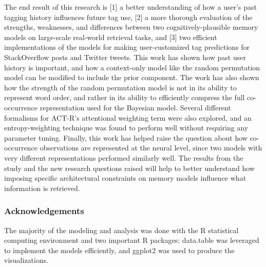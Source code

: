 \documentclass[man,floatsintext,donotrepeattitle]{apa6}
\begin{document}
The end result of this research is [1] a better understanding of how a user's past tagging history influences future tag use,
[2] a more thorough evaluation of the strengths, weaknesses, and differences between two cognitively-plausible memory models on large-scale real-world retrieval tasks,
and [3] two efficient implementations of the models for making user-customized tag predictions for StackOverflow posts and Twitter tweets. 
This work has shown how past user history is important, and how a context-only model like the random permutation model can be modified to include the prior component.
The work has also shown how the strength of the random permutation model is not in its ability to represent word order,
and rather in its ability to efficiently compress the full co-occurrence representation used for the Bayesian model.
Several different formalisms for ACT-R's attentional weighting term were also explored, and an entropy-weighting technique was found to perform well without requiring any parameter tuning.
Finally, this work has helped raise the question about how co-occurrence observations are represented at the neural level, since two models with very different representations performed similarly well.
The results from the study and the new research questions raised will help to better understand how imposing specific architectural constraints on memory models influence what information is retrieved.

\subsubsection{Acknowledgements}

The majority of the modeling and analysis was done with the R statistical computing environment \parencite{RCoreTeam2014} and two important R packages:
data.table \parencite{Dowle2014} was leveraged to implement the models efficiently, and ggplot2 \parencite{Wickham2009} was used to produce the visualizations.

\begingroup
{}
\setlength\bibitemsep{12pt}
\clearpage
\printbibliography[heading=bibintoc]
\endgroup
\end{document}
